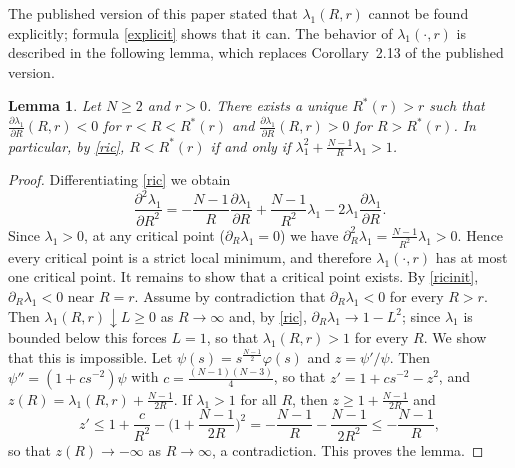\documentclass[11pt]{amsart}
\newtheorem{lemma}{Lemma}[section]
\theoremstyle{remark}
\numberwithin{equation}{section}
\begin{document}
The published version of this paper stated that $\lambda_1(R,r)$ cannot be found explicitly; formula \eqref{explicit} shows that it can. The behavior of $\lambda_1(\cdot,r)$ is described in the following lemma, which replaces Corollary~2.13 of the published version.

\begin{lemma}\label{l.min}
Let $N\ge2$ and $r>0$. There exists a unique $R^*(r)>r$ such that $\frac{\partial\lambda_1}{\partial R}(R,r)<0$ for $r<R<R^*(r)$ and $\frac{\partial\lambda_1}{\partial R}(R,r)>0$ for $R>R^*(r)$. In particular, by \eqref{ric}, $R<R^*(r)$ if and only if $\lambda_1^2+\frac{N-1}R\lambda_1>1$.
\end{lemma}

\begin{proof}
Differentiating \eqref{ric} we obtain
\[
\frac{\partial^2\lambda_1}{\partial R^2}=-\frac{N-1}R\frac{\partial\lambda_1}{\partial R}+\frac{N-1}{R^2}\lambda_1-2\lambda_1\frac{\partial\lambda_1}{\partial R}.
\]
Since $\lambda_1>0$, at any critical point ($\partial_R\lambda_1=0$) we have $\partial^2_R\lambda_1=\frac{N-1}{R^2}\lambda_1>0$. Hence every critical point is a strict local minimum, and therefore $\lambda_1(\cdot,r)$ has at most one critical point. It remains to show that a critical point exists. By \eqref{ricinit}, $\partial_R\lambda_1<0$ near $R=r$. Assume by contradiction that $\partial_R\lambda_1<0$ for every $R>r$. Then $\lambda_1(R,r)\downarrow L\ge0$ as $R\to\infty$ and, by \eqref{ric}, $\partial_R\lambda_1\to1-L^2$; since $\lambda_1$ is bounded below this forces $L=1$, so that $\lambda_1(R,r)>1$ for every $R$. We show that this is impossible. Let $\psi(s)=s^{\frac{N-1}2}\varphi(s)$ and $z=\psi'/\psi$. Then $\psi''=(1+cs^{-2})\psi$ with $c=\frac{(N-1)(N-3)}4$, so that $z'=1+cs^{-2}-z^2$, and $z(R)=\lambda_1(R,r)+\frac{N-1}{2R}$. If $\lambda_1>1$ for all $R$, then $z\ge1+\frac{N-1}{2R}$ and
\[
z'\le1+\frac c{R^2}-\Big(1+\frac{N-1}{2R}\Big)^2=-\frac{N-1}R-\frac{N-1}{2R^2}\le-\frac{N-1}R,
\]
so that $z(R)\to-\infty$ as $R\to\infty$, a contradiction. This proves the lemma.
\end{proof}
\end{document}
